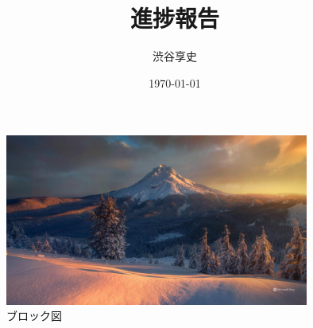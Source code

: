 \documentclass[a4paper,11pt]{jsarticle}
\begin{document}
\title{進捗報告}
\author{渋谷享史}
\date{\today}
\maketitle
\begin{figure}[htbp]
  \vspace{5mm}
  \center
  \includegraphics[width=100mm]{images/20240208.jpg}
  \caption{ブロック図}
  \label{block}
  \vspace{5mm}
\end{figure}
\end{document}
